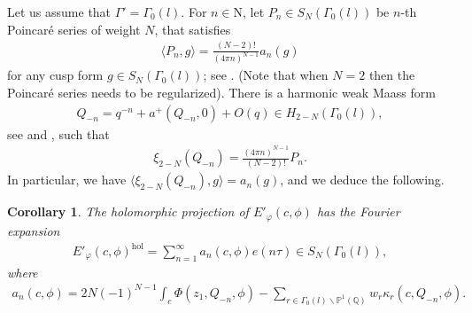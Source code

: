 \documentclass[twoside,a4paper,10pt]{article} %
\newcommand{\8}{\infty}
\newcommand{\Q}{\mathbb{Q}}
\newcommand{\PP}{\mathbb{P}}
\newcommand{\N}{\mathrm{N}}
\newcommand{\hol}{\mathrm{hol}}
\theoremstyle{mytheoremstyle}
\newtheorem{cor}{Corollary}[thm]
\theoremstyle{remark}
\numberwithin{equation}{section}
\begin{document}
Let us assume that $\Gamma'=\Gamma_0(l)$. For $n \in \N$, let $P_n \in S_N(\Gamma_0(l))$ be $n$-th Poincaré series of weight $N$, that satisfies
\begin{align}
\langle P_{n},g \rangle = \frac{(N-2)!}{(4\pi n)^{N-1}}a_n(g)
\end{align}
for any cusp form $g \in S_N(\Gamma_0(l))$; see \cite[\S 1.2]{bruinierborch}. (Note that when $N=2$ then the Poincar\'e series needs to be regularized). There is a harmonic weak Maass form 
\begin{align}
Q_{-n}=q^{-n}+a^+(Q_{-n},0) +O(q) \in H_{2-N}(\Gamma_0(l)),
\end{align} 
see \cite[\S6]{bor} and \cite[\S 1.3]{bruinierborch}, such that
\begin{align}
\xi_{2-N}(Q_{-n})=\frac{(4\pi n)^{N-1}}{(N-2)!}P_n.
\end{align}
In particular, we have $\langle \xi_{2-N}(Q_{-n}),g \rangle=a_n(g)$, and we deduce the following.

\begin{cor} \label{cor holo into} The holomorphic projection of $E'_\varphi(c,\phi)$ has the Fourier expansion
\begin{align}
 E'_\varphi(c,\phi)^\hol= \sum_{n =1}^\8 a_n(c,\phi)e(n \tau) \in S_N(\Gamma_0(l)),
\end{align}
where
\begin{align}
a_n(c,\phi) = 2N (-1)^{N-1}\int_{c}\Phi(z_1,Q_{-n},\phi) - \sum_{ r \in \Gamma_0(l) \backslash \PP^1(\Q)}w_r \kappa_r(c,Q_{-n},\phi).
\end{align}
\end{cor}
\end{document}
